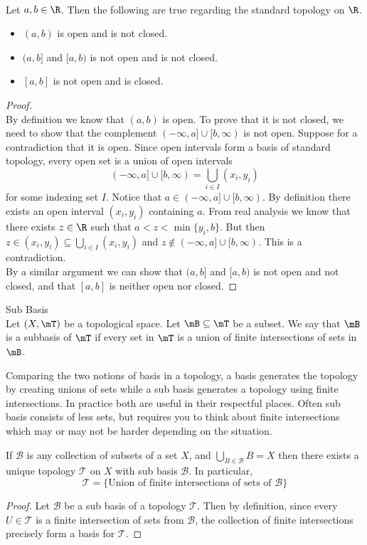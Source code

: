 \documentclass[a4paper]{article}
\begin{document}
\begin{eg}{}{}\\
Let $a,b\in\R$. Then the following are true regarding the standard topology on $\R$. 
\begin{itemize}
\item $(a,b)$ is open and is not closed. 
\item $(a,b]$ and $[a,b)$ is not open and is not closed. 
\item $[a,b]$ is not open and is closed. 
\end{itemize}
\begin{proof}\\
By definition we know that $(a,b)$ is open. To prove that it is not closed, we need to show that the complement $(-\infty,a]\cup[b,\infty)$ is not open. Suppose for a contradiction that it is open. Since open intervals form a basis of standard topology, every open set is a union of open intervals $$(-\infty,a]\cup[b,\infty)=\bigcup_{i\in I}(x_i,y_i)$$ for some indexing set $I$. Notice that $a\in(-\infty,a]\cup[b,\infty)$. By definition there exists an open interval $(x_i,y_i)$ containing $a$. From real analysis we know that there exists $z\in\R$ such that $a<z<\min\{y_i,b\}$. But then $z\in(x_i,y_i)\subseteq\bigcup_{i\in I}(x_i,y_i)$ and $z\notin(-\infty,a]\cup[b,\infty)$. This is a contradiction. \\

By a similar argument we can show that $(a,b]$ and $[a,b)$ is not open and not closed, and that $[a,b]$ is neither open nor closed. 
\end{proof}
\end{eg}

\begin{defn}{Sub Basis}{}\\
Let $(X,\mT)$ be a topological space. Let $\mB\subseteq\mT$ be a subset. We say that $\mB$ is a subbasis of $\mT$ if every set in $\mT$ is a union of finite intersections of sets in $\mB$. 
\end{defn}

Comparing the two notions of basis in a topology, a basis generates the topology by creating unions of sets while a sub basis generates a topology using finite intersections. In practice both are useful in their respectful places. Often sub basis consists of less sets, but requires you to think about finite intersections which may or may not be harder depending on the situation. 

\begin{prp}{}{} If $\mathcal{B}$ is any collection of subsets of a set $X$, and $\bigcup_{B\in\mathcal{B}}B=X$ then there exists a unique topology $\mathcal{T}$ on $X$ with sub basis $\mathcal{B}$. In particular, $$\mathcal{T}=\{\text{Union of finite intersections of sets of }\mathcal{B}\}$$ 
\begin{proof}
Let $\mathcal{B}$ be a sub basis of a topology $\mathcal{T}$. Then by definition, since every $U\in\mathcal{T}$ is a finite intersection of sets from $\mathcal{B}$, the collection of finite intersections precisely form a basis for $\mathcal{T}$. 
\end{proof}
\end{prp}
\end{document}
